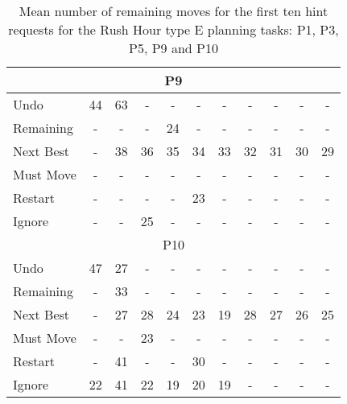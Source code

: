 \begin{table}[tpb]
{\begin{tabular}{|l|cccccccccc|}
\multicolumn{11}{|c|}{P9} \\ \hline
Undo & 44 & 63 & - & - & - & - & - & - & - & - \\ \cline{1-1}
Remaining & - & - & - & 24 & - & - & - & - & - & - \\ \cline{1-1}
Next Best & - & 38 & 36 & 35 & 34 & 33 & 32 & 31 & 30 & 29 \\ \cline{1-1}
Must Move & - & - & - & - & - & - & - & - & - & - \\ \cline{1-1}
Restart & - & - & - & - & 23 & - & - & - & - & - \\ \cline{1-1}
Ignore & - & - & 25 & - & - & - & - & - & - & - \\ \hline
\multicolumn{11}{|c|}{P10} \\ \hline
Undo & 47 & 27 & - & - & - & - & - & - & - & - \\ \cline{1-1}
Remaining & - & 33 & - & - & - & - & - & - & - & - \\ \cline{1-1}
Next Best & - & 27 & 28 & 24 & 23 & 19 & 28 & 27 & 26 & 25 \\ \cline{1-1}
Must Move & - & - & 23 & - & - & - & - & - & - & - \\ \cline{1-1}
Restart & - & 41 & - & - & 30 & - & - & - & - & - \\ \cline{1-1}
Ignore & 22 & 41 & 22 & 19 & 20 & 19 & - & - & - & - \\ \hline
\end{tabular}%
}
\caption{Mean number of remaining moves for the first ten hint requests for the Rush Hour type E planning tasks: P1, P3, P5, P9 and P10}
\label{tab:requesttypee}
\end{table}

